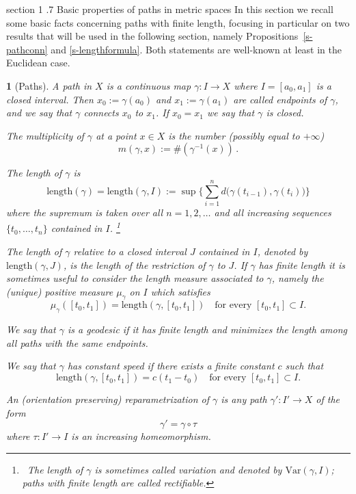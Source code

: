 \documentclass[11pt,reqno,a4paper,final]{amsart}
\makeatletter
\numberwithin{equation}{section}
\theoremstyle{mytheorem}
\theoremstyle{myremark}
\theoremstyle{myparagraph}
\newtheorem{parag}[subsection]{}
\def\section{\@startsection%
{section}%
{1}%
\z@{1.5\linespacing\@plus .2\linespacing}%
  {.7\linespacing}%
  {\normalfont\sc\centering}}%
\newcommand{\footnoteb}[1]{\footnote{~#1}}
\newcommand{\Len}{\mathrm{length}}
\makeatother
\begin{document}
\section{Basic properties of paths in metric spaces}
\label{s3}
In this section we recall some basic facts
concerning paths with finite length, focusing
in particular on two results that will be used in the following 
section, namely Propositions~\ref{s-pathconn}
and \ref{s-lengthformula}.
Both statements are well-known at least in the Euclidean case. 

\begin{parag}[Paths]
\label{s-path}
A \emph{path} in $X$ is a continuous map $\gamma:I\to X$ where $I=[a_0,a_1]$ is 
a closed interval. Then $x_0:=\gamma(a_0)$ and $x_1:=\gamma(a_1)$ are 
called \emph{endpoints} of $\gamma$, and we say that $\gamma$ connects 
$x_0$ to $x_1$.
If $x_0=x_1$ we say that $\gamma$ is \emph{closed}.

The \emph{multiplicity} of $\gamma$ at a point $x\in X$ is the number (possibly equal
to $+\infty$) 
\[
m(\gamma,x):=\#(\gamma^{-1}(x)) 
\, .
\]

The \emph{length} of $\gamma$ is
\[
\Len(\gamma) 
= \Len(\gamma,I) 
:= \sup \bigg\{ \sum_{i=1}^n d \big( \gamma(t_{i-1}),\gamma(t_i) \big) \bigg\}
\]
where the supremum is taken over all $n=1,2,\dots$ and all increasing sequences 
$\{t_0,\dots,t_n\}$ contained in $I$.%
%
\footnoteb{The length of $\gamma$ is sometimes called \emph{variation} and 
denoted by $\mathrm{Var}(\gamma,I)$; paths with finite length are called 
\emph{rectifiable}.}
% 

The length of $\gamma$ relative to a closed interval $J$ contained in $I$, 
denoted by $\Len(\gamma,J)$, is the length of the restriction of $\gamma$ 
to $J$.
If $\gamma$ has finite length it is sometimes useful to consider 
the \emph{length measure} associated to $\gamma$, namely the (unique) 
positive measure $\mu_\gamma$ on $I$ which satisfies
\[
\mu_\gamma([t_0,t_1]) = \Len(\gamma,[t_0,t_1])
\quad\text{for every $[t_0,t_1]\subset I$.}
\]

We say that $\gamma$ is a \emph{geodesic} if it has finite length
and minimizes the length among all paths 
with the same endpoints.

We say that $\gamma$ has \emph{constant speed} if there exists 
a finite constant $c$ such that
\[
\Len(\gamma,[t_0,t_1]) = c(t_1-t_0)
\quad\text{for every $[t_0,t_1] \subset I$.}
\]

An (orientation preserving) \emph{reparametrization} of 
$\gamma$ is any path $\gamma':I'\to X$ of the form
\[
\gamma' = \gamma\circ\tau
\]
where $\tau:I'\to I$ is an increasing homeomorphism.
\end{parag}
\end{document}
